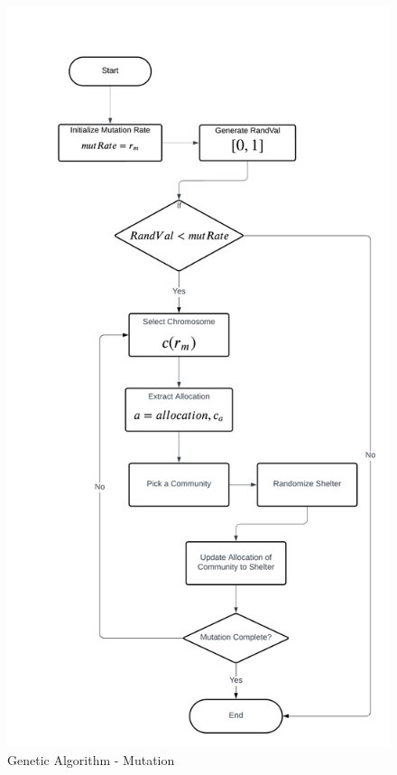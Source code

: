 \begin{appendices}
\begin{centerappendixtitle}
		\begin{figure}[h]
			\centering
			\caption{Genetic Algorithm - Mutation}
			\label{mutateFlow}
			\includegraphics[width=\textwidth,height=\textheight,keepaspectratio]{appendix/mutate f}
		\end{figure}
		

\end{centerappendixtitle}
\end{appendices}
